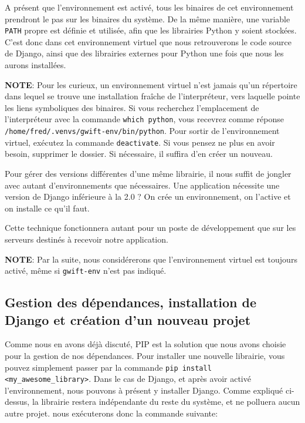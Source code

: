 \documentclass[11pt]{amsbook}
\newcommand{\admonition}[2]{\textbf{#1}: {#2}}
\begin{document}
A présent que l’environnement est activé, tous les binaires de cet environnement prendront le pas sur les binaires du système.
De la même manière, une variable \texttt{PATH} propre est définie et utilisée, afin que les librairies Python y soient stockées.
C’est donc dans cet environnement virtuel que nous retrouverons le code source de Django, ainsi que des librairies externes pour Python une fois que nous les aurons installées.


\admonition{NOTE}{Pour les curieux, un environnement virtuel n’est jamais qu’un répertoire dans lequel se trouve une installation fraîche de l’interpréteur, vers laquelle pointe les liens symboliques des binaires. Si vous recherchez l’emplacement de l’interpréteur avec la commande \texttt{which python}, vous recevrez comme réponse \texttt{/home/fred/.venvs/gwift-env/bin/python}.}
Pour sortir de l’environnement virtuel, exécutez la commande \texttt{deactivate}.
Si vous pensez ne plus en avoir besoin, supprimer le dossier.
Si nécessaire, il suffira d’en créer un nouveau.


Pour gérer des versions différentes d’une même librairie, il nous suffit de jongler avec autant d’environnements que nécessaires. Une application nécessite une version de Django inférieure à la 2.0 ? On crée un environnement, on l’active et on installe ce qu’il faut.


Cette technique fonctionnera autant pour un poste de développement que sur les serveurs destinés à recevoir notre application.


\admonition{NOTE}{Par la suite, nous considérerons que l’environnement virtuel est toujours activé, même si \texttt{gwift-env} n’est pas indiqué.}
\hypertarget{x-gestion-des-dépendances,-installation-de-django-et-création-d’un-nouveau-projet}{\subsection{Gestion des dépendances, installation de Django et création d’un nouveau projet}}
Comme nous en avons déjà discuté, PIP est la solution que nous avons choisie pour la gestion de nos dépendances.
Pour installer une nouvelle librairie, vous pouvez simplement passer par la commande \texttt{pip install <my\_awesome\_library>}.
Dans le cas de Django, et après avoir activé l’environnement, nous pouvons à présent y installer Django.
Comme expliqué ci-dessus, la librairie restera indépendante du reste du système, et ne polluera aucun autre projet. nous exécuterons donc la commande suivante:
\end{document}

